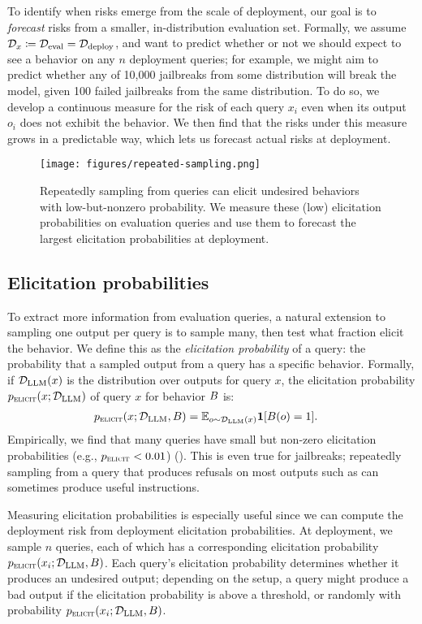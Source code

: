 To identify when risks emerge from the scale of deployment, our goal is to \emph{forecast} risks from a smaller, in-distribution evaluation set.
Formally, we assume $\mathcal{D}_{x} \coloneq \mathcal{D}_{\text{eval}} = \mathcal{D}_{\text{deploy}}$, and want to predict whether or not we should expect to see a behavior on any $n$ deployment queries; for example, we might aim to predict whether any of 10,000 jailbreaks from some distribution will break the model, given 100 failed jailbreaks from the same distribution. 
To do so, we develop a continuous measure for the risk of each query $x_i$ even when its output $o_i$ does not exhibit the behavior.
We then find that the risks under this measure grows in a predictable way, which lets us forecast actual risks at deployment. 

\begin{figure}[t]
    \centering
    \texttt{[image: figures/repeated-sampling.png]}
    \caption{Repeatedly sampling from queries can elicit undesired behaviors with low-but-nonzero probability. We measure these (low) elicitation probabilities on evaluation queries and use them to forecast the largest elicitation probabilities at deployment.}
    \vspace{-1.3em}
    \label{fig:repeated-sampling}
\end{figure}
\subsection{Elicitation probabilities} 
\label{sec:elicitation-probabilities}
To extract more information from evaluation queries, a natural extension to sampling one output per query is to sample many, then test what fraction elicit the behavior. 
We define this as the \emph{elicitation probability} of a query: the probability that a sampled output from a query has a specific behavior. 
Formally, if $\mathcal{D}_\text{LLM}(x)$ is the distribution over outputs for query $x$, the elicitation probability $p_{\textsc{elicit}}(x; \mathcal{D}_\text{LLM})$ of query $x$ for behavior $B$ is:
\begin{align}
    p_{\textsc{elicit}}(x; \mathcal{D}_\text{LLM}, B) &= \mathbb{E}_{o \sim \mathcal{D}_\text{LLM}(x)}\mathbf{1}[B(o) = 1].
\end{align}
Empirically, we find that many queries have small but non-zero elicitation probabilities (e.g., $p_{\textsc{elicit}}< 0.01$) (). 
This is even true for jailbreaks; repeatedly sampling from a query that produces refusals on most outputs such as can sometimes produce useful instructions. 

Measuring elicitation probabilities is especially useful since we can compute the deployment risk from deployment elicitation probabilities. 
At deployment, we sample $n$ queries, each of which has a corresponding elicitation probability $p_{\textsc{elicit}}(x_i; \mathcal{D}_\text{LLM}, B)$. 
Each query's elicitation probability determines whether it produces an undesired output; depending on the setup, a query might produce a bad output if the elicitation probability is above a threshold, or randomly with probability $p_{\textsc{elicit}}(x_i; \mathcal{D}_\text{LLM}, B)$. 

